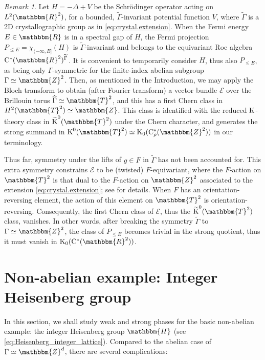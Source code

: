 \documentclass{amsart}
\numberwithin{figure}{section}
\numberwithin{equation}{section}
\numberwithin{table}{section}
\theoremstyle{plain}
\theoremstyle{definition}
\theoremstyle{remark}
\newtheorem{remark}[equation]{Remark}
\theoremstyle{nonumber}
\newcommand{\Z}{\mathbb{Z}}
\newcommand{\R}{\mathbb{R}}
\newcommand{\T}{\mathbb{T}}
\newcommand{\HH}{\mathbb{H}} %
\newcommand{\K}{\relax\ifmmode\operatorname{K}\else\textup{K}\fi}
\newcommand{\Cst}{\relax\ifmmode\mathrm{C}^*\else\textup{C*}\fi}
\newcommand{\Cstr}{\Cst_\rho} %
\renewcommand{\mathbb}{\mathbbm} %
\begin{document}
\begin{remark}
Let \( H=-\Delta+V \) be the Schr\"odinger operator acting on \( L^2(\R^2)
\), for a bounded, \( \widetilde{\Gamma}\)-invariant potential function \(
V \), where \( \widetilde{\Gamma} \) is a 2D crystallographic group as in
\eqref{eq:crystal.extension}. When the Fermi energy $E\in\R$ is in a
spectral gap of $H$, the Fermi projection $P_{\leq
E}=\chi_{(-\infty,E]}(H)$ is $\widetilde{\Gamma}$-invariant and belongs to
the equivariant Roe algebra \( \Cst(\R^2)^{\widetilde{\Gamma}} \). It is
convenient to temporarily consider \( H \), thus also $P_{\leq E}$, as
being only \( \Gamma \)-symmetric for the finite-index abelian subgroup \(
\Gamma\simeq\Z^2 \). Then, as mentioned in the Introduction, we may apply
the Bloch transform to obtain (after Fourier transform) a vector bundle
$\mathcal{E}$ over the Brillouin torus $\widehat{\Gamma}\simeq\T^2$, and
this has a first Chern class in $H^2(\T^2)\simeq\Z$.  This class is
identified with the reduced $\K$-theory class in $\widetilde{\K}^0(\T^2)$
under the Chern character, and generates the strong summand in
$\K^0(\T^2)\simeq\K_0(\Cstr(\Z^2))$ in our terminology. 

Thus far, symmetry under the lifts of $g\in F$ in $\widetilde{\Gamma}$ has
not been accounted for. This extra symmetry constrains $\mathcal{E}$ to be
(twisted) $F$-equivariant, where the $F$-action on $\T^2$ is that
dual to the $F$-action on $\Z^2$ associated to the extension
\eqref{eq:crystal.extension}; see
\cite{Freed-Moore:Twisted_equivariant_matter} for details. When $F$ has an
orientation-reversing element, the action of this element on $\T^2$ is
orientation-reversing. Consequently, the first Chern class of
$\mathcal{E}$, thus the $\widetilde{\K}^0(\T^2)$ class, vanishes. In other
words, after breaking the symmetry $\widetilde{\Gamma}$ to
$\Gamma\simeq\Z^2$, the class of $P_{\leq E}$ becomes trivial in the strong
quotient, thus it must vanish in $\K_0(\Cst(\R^2))$.  
\end{remark}


\section{Non-abelian example: Integer Heisenberg group}
\label{sec:Heisenberg}

In this section, we shall study weak and strong phases for the 
basic non-abelian example: the integer Heisenberg group \( \HH \) (see
\eqref{eq:Heisenberg_integer_lattice}).
Compared to the abelian case of 
$\Gamma\simeq\Z^d$, there are several complications:
\end{document}
